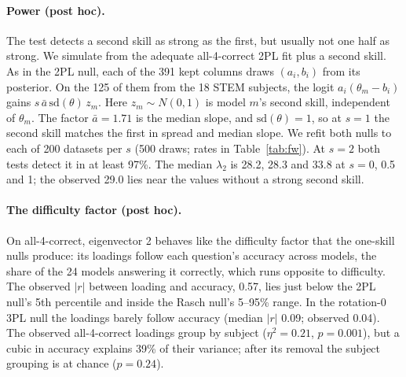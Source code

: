\documentclass{article}
\theoremstyle{plain}
\theoremstyle{remark}
\begin{document}
\paragraph{Power (post hoc).} The test detects a second skill as strong as the
first, but usually not one half as strong. We simulate
from the adequate all-4-correct 2PL fit plus a second skill. As in the
2PL null, each of the 391 kept columns draws $(a_i,b_i)$ from its
posterior. On the 125 of them from the 18 STEM subjects, the logit
$a_i(\theta_m-b_i)$ gains $s\,\bar a\,\mathrm{sd}(\theta)\,z_m$. Here
$z_m\sim N(0,1)$ is model $m$'s second skill, independent of
$\theta_m$. The factor $\bar a=1.71$ is the median slope, and
$\mathrm{sd}(\theta)=1$, so at $s=1$ the second skill matches the first
in spread and median slope. We refit both nulls to each of 200
datasets per $s$ (500 draws; rates in Table~\ref{tab:fw}). At $s=2$
both tests detect it in at least 97\%. The median $\lambda_2$ is 28.2, 28.3
and 33.8 at $s=0$, 0.5 and 1; the observed 29.0 lies near the values
without a strong second skill.

\paragraph{The difficulty factor (post hoc).} On all-4-correct, eigenvector 2 behaves
like the difficulty factor that the one-skill nulls produce: its
loadings follow each question's accuracy across models, the share of the 24 models answering it correctly, which runs opposite to difficulty.
The observed $|r|$ between loading and accuracy, 0.57, lies just below the 2PL null's 5th
percentile and inside the Rasch null's 5--95\% range. In the rotation-0 3PL null the loadings barely follow accuracy (median $|r|$
0.09; observed 0.04). The observed all-4-correct loadings group by
subject ($\eta^2=0.21$, $p=0.001$), but a cubic in accuracy explains
39\% of their variance; after its removal the subject grouping is at
chance ($p=0.24$).
\end{document}
